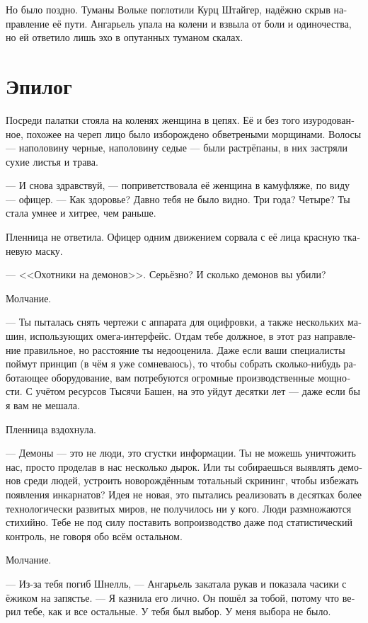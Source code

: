 \documentclass[a4paper,12pt,fleqn]{book}\usepackage{cooltooltips}\usepackage{polyglossia}\setdefaultlanguage[babelshorthands=true]{russian}\setotherlanguage{english}\defaultfontfeatures{Ligatures=TeX,Mapping=tex-text} \usepackage{xcolor}\definecolor{lightgray}{HTML}{bbbbbb}\color{lightgray}\newcommand{\ml}[3]{\textenglish{\textcolor{black}{#3}}}
\begin{document}
Но было поздно.
Туманы Вольке поглотили Курц Штайгер, надёжно скрыв направление её пути.
Ангарьель упала на колени и взвыла от боли и одиночества, но ей ответило лишь эхо в опутанных туманом скалах.

\section{Эпилог}

Посреди палатки стояла на коленях женщина в цепях.
Её и без того изуродованное, похожее на череп лицо было изборождено обветреными морщинами.
Волосы --- наполовину черные, наполовину седые --- были растрёпаны, в них застряли сухие листья и трава.

--- И снова здравствуй, --- поприветствовала её женщина в камуфляже, по виду --- офицер.
--- Как здоровье?
Давно тебя не было видно.
Три года?
Четыре?
Ты стала умнее и хитрее, чем раньше.

Пленница не ответила.
Офицер одним движением сорвала с её лица красную тканевую маску.

--- <<Охотники на демонов>>.
Серьёзно?
И сколько демонов вы убили?

Молчание.

--- Ты пыталась снять чертежи с аппарата для оцифровки, а также нескольких машин, использующих омега-интерфейс.
Отдам тебе должное, в этот раз направление правильное, но расстояние ты недооценила.
Даже если ваши специалисты поймут принцип (в чём я уже сомневаюсь), то чтобы собрать сколько-нибудь работающее оборудование, вам потребуются огромные производственные мощности.
С учётом ресурсов Тысячи Башен, на это уйдут десятки лет --- даже если бы я вам не мешала.

Пленница вздохнула.

--- Демоны --- это не люди, это сгустки информации.
Ты не можешь уничтожить нас, просто проделав в нас несколько дырок.
Или ты собираешься выявлять демонов среди людей, устроить новорождённым тотальный скрининг, чтобы избежать появления инкарнатов?
Идея не новая, это пытались реализовать в десятках более технологически развитых миров, не получилось ни у кого.
Люди размножаются стихийно.
Тебе не под силу поставить вопроизводство даже под статистический контроль, не говоря обо всём остальном.

Молчание.

--- Из-за тебя погиб Шнелль, --- Ангарьель закатала рукав и показала часики с ёжиком на запястье.
--- Я казнила его лично.
Он пошёл за тобой, потому что верил тебе, как и все остальные.
У тебя был выбор.
У меня выбора не было.
\end{document}
